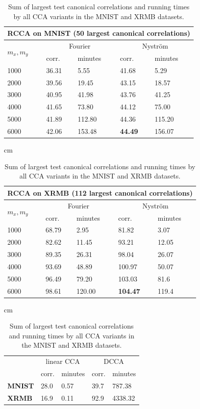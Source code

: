 \documentclass{article}
\begin{document}
  \begin{table}[h!]
  \begin{center}
    \begin{tabular}{|p{1.1cm}|p{1.25cm}|p{1.25cm}|p{1.25cm}|p{1.25cm}|}
      \multicolumn{5}{c}{RCCA on \textbf{MNIST} (50 largest canonical correlations)}\\
      \hline
      \multirow{2}{*}{$m_x,m_y$}  & \multicolumn{2}{|c|}{Fourier} &
      \multicolumn{2}{|c|}{Nystr\"om}\\\cline{2-5}
           & corr. & minutes& corr. & minutes \\\hline
      1000 & 36.31 & 5.55   & 41.68 & 5.29   \\\hline
      2000 & 39.56 & 19.45  & 43.15 & 18.57  \\\hline
      3000 & 40.95 & 41.98  & 43.76 & 41.25  \\\hline
      4000 & 41.65 & 73.80  & 44.12 & 75.00  \\\hline
      5000 & 41.89 & 112.80 & 44.36 & 115.20 \\\hline
      6000 & 42.06 & 153.48 & \textbf{44.49} & 156.07 \\\hline
    \end{tabular}
     cm
    \begin{tabular}{|p{1.1cm}|p{1.25cm}|p{1.25cm}|p{1.25cm}|p{1.25cm}|}
      \multicolumn{5}{c}{RCCA on \textbf{XRMB} (112 largest canonical correlations)}\\
      \hline
      \multirow{2}{*}{$m_x,m_y$}  & \multicolumn{2}{|c|}{Fourier} & \multicolumn{2}{|c|}{Nystr\"om}\\\cline{2-5}
           & corr. & minutes& corr.  & minutes\\\hline
      1000 & 68.79 & 2.95   & 81.82  & 3.07 \\\hline
      2000 & 82.62 & 11.45  & 93.21  & 12.05 \\\hline
      3000 & 89.35 & 26.31  & 98.04  & 26.07 \\\hline
      4000 & 93.69 & 48.89  & 100.97 & 50.07 \\\hline
      5000 & 96.49 & 79.20  & 103.03 & 81.6 \\\hline
      6000 & 98.61 & 120.00 & \textbf{104.47} & 119.4 \\\hline
    \end{tabular}
     cm
    \begin{tabular}{|p{1.1cm}|p{1.25cm}|p{1.25cm}|p{1.25cm}|p{1.25cm}|}
    \cline{2-5}
    \multicolumn{1}{c|}{} & \multicolumn{2}{|c|}{linear CCA} & \multicolumn{2}{|c|}{DCCA} \\\cline{2-5}
    \multicolumn{1}{c|}{} & corr. & minutes & corr. & minutes\\\hline
    \bf MNIST & 28.0 & 0.57 & 39.7 & 787.38  \\\hline
    \bf XRMB  & 16.9 & 0.11 & 92.9 & 4338.32 \\\hline
    \end{tabular}
  \end{center}
    \caption{Sum of largest test canonical correlations and running times by
    all CCA variants in the MNIST and XRMB datasets.}
    \label{table:real}
  \end{table}
\end{document}
